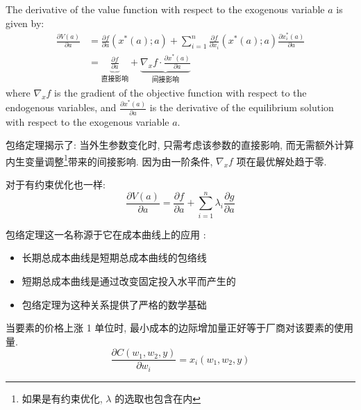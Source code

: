 \begin{theorem}
    The derivative of the value function with respect to the exogenous variable $a$ is given by:
    $$ \begin{aligned}\frac{\partial V(a)}{\partial a} &= \frac{\partial f}{\partial a} (x^*(a);a) + \sum_{i=1}^{n} \frac{\partial f}{\partial x_i} (x^*(a);a) \frac{\partial x^*_i(a)}{\partial a} \\ &=  \underbrace{\frac{\partial f}{\partial a}}_{\text{直接影响}} + \underbrace{\nabla_x f \cdot \frac{\partial x^*(a)}{\partial a}}_{\text{间接影响}} \end{aligned} $$
    where $\nabla_x f$ is the gradient of the objective function with respect to the endogenous variables, and $\frac{\partial x^*(a)}{\partial a}$ is the derivative of the equilibrium solution with respect to the exogenous variable $a$.
\end{theorem}

\begin{note}
包络定理揭示了: 当外生参数变化时, 只需考虑该参数的直接影响, 而无需额外计算内生变量调整\footnote{如果是有约束优化, $\lambda$ 的选取也包含在内}带来的间接影响. 因为由一阶条件,  $\nabla_x f$ 项在最优解处趋于零.

\end{note}

对于有约束优化也一样:
$$\frac{\partial V(a)}{\partial a} = \frac{\partial f}{\partial a} + \sum_{i=1}^{n} \lambda_i \frac{\partial g}{\partial a} $$

包络定理这一名称源于它在成本曲线上的应用 :
\begin{itemize}
    \item 长期总成本曲线是短期总成本曲线的包络线
    \item 短期总成本曲线是通过改变固定投入水平而产生的
    \item 包络定理为这种关系提供了严格的数学基础
\end{itemize}

\begin{proposition}
    当要素的价格上涨 1 单位时, 最小成本的边际增加量正好等于厂商对该要素的使用量. 
    $$ \frac{\partial C(w_1,w_2,y)}{\partial w_i} = x_i(w_1,w_2,y) $$
\end{proposition}
%







